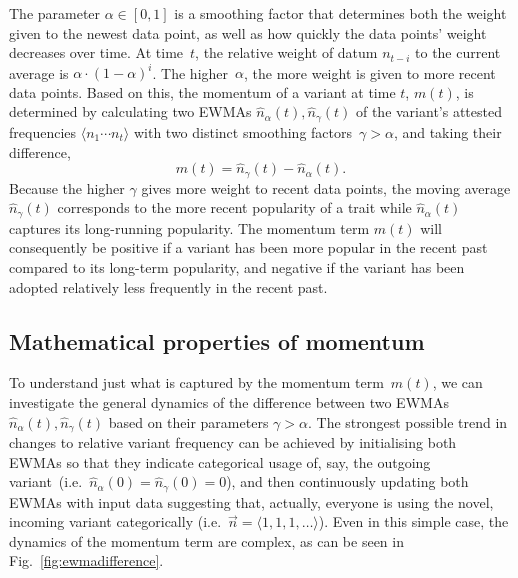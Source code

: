 The parameter $\alpha\in[0,1]$ is a smoothing factor that determines both the weight given to the newest data point, as well as how quickly the data points' weight decreases over time. At time~$t$, the relative weight of datum $n_{t-i}$ to the current average is $\alpha\cdot(1-\alpha)^i$. The higher~$\alpha$, the more weight is given to more recent data points. Based on this, the momentum of a variant at time $t$, $m(t)$, is determined by calculating two EWMAs $\hat{n}_\alpha(t), \hat{n}_\gamma(t)$ of the variant's attested frequencies $\langle n_1\cdots n_t\rangle$ with two distinct smoothing factors~$\gamma>\alpha$, and taking their difference,
\begin{equation}
m(t) = \hat{n}_\gamma(t) - \hat{n}_\alpha(t).
\label{eq:momentum}
\end{equation}
Because the higher $\gamma$ gives more weight to recent data points, the moving average $\hat{n}_\gamma(t)$ corresponds to the more recent popularity of a trait while $\hat{n}_\alpha(t)$ captures its long-running popularity. The momentum term $m(t)$ will consequently be positive if a variant has been more popular in the recent past compared to its long-term popularity, and negative if the variant has been adopted relatively less frequently in the recent past.

\subsection{Mathematical properties of momentum}

To understand just what is captured by the momentum term~$m(t)$, we can investigate the general dynamics of the difference between two EWMAs $\hat{n}_\alpha(t), \hat{n}_\gamma(t)$ based on their parameters $\gamma>\alpha$. %
The strongest possible trend in changes to relative variant frequency can be achieved by initialising both EWMAs so that they indicate categorical usage of, say, the outgoing variant~(i.e.~$\hat{n}_\alpha(0)=\hat{n}_\gamma(0)=0$), and then continuously updating both EWMAs with input data suggesting that, actually, everyone is using the novel, incoming variant categorically (i.e.~$\vec{n}=\langle1,1,1,\ldots\rangle$). Even in this simple case, the dynamics of the momentum term are complex, as can be seen in Fig.~\ref{fig:ewmadifference}.

